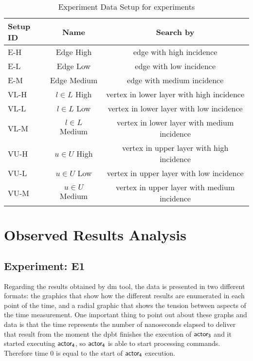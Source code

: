 \begin{table}[H]
  \centering
  \begin{tabular}{|l|c|c|}
    \hline
   \textbf{Setup ID} & \textbf{Name} & \textbf{Search by}\\
   \hline
   E-H & Edge High & edge with high incidence \\
   \hline
   E-L & Edge Low & edge with low incidence \\
   \hline
   E-M & Edge Medium & edge with medium incidence \\
   \hline
   VL-H & $l \in L$ High & vertex in lower layer with high incidence \\
   \hline
   VL-L & $l \in L$ Low & vertex in lower layer with low incidence \\
   \hline
   VL-M & $l \in L$ Medium & vertex in lower layer with medium incidence \\
   \hline
   VU-H & $u \in U$ High & vertex in upper layer with high incidence \\
   \hline
   VU-L & $u \in U$ Low & vertex in upper layer with low incidence \\
   \hline
   VU-M & $u \in U$ Medium & vertex in upper layer with medium incidence \\
   \hline
  \end{tabular}
 \caption{Experiment Data Setup for experiments}
 \label{table:exp:data-setup}
 \end{table}

\section{\textbf{Observed Results Analysis}}\label{sec:discussion}
\subsection{Experiment: E1}\label{sub:sec:res:e1}
Regarding the results obtained by \acrshort{dm} tool, the data is presented in two different formats: the graphics that show 
how the different results are enumerated in each point of the time, and a radial graphic that shows the tension between aspects of the time measurement.
One important thing to point out about these graphs and data is that the time represents the number of nanoseconds elapsed to deliver that result from the moment the \acrshort{dpbt} finishes the execution of $\mathsf{actor_3}$ and it started executing $\mathsf{actor_4}$, so $\mathsf{actor_4}$ is able to start processing commands. 
Therefore time $0$ is equal to the start of $\mathsf{actor_4}$ execution.

